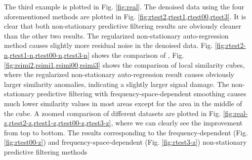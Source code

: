 The third example is plotted in Fig. \ref{fig:real}. The denoised data using the four aforementioned methods are plotted in Fig. \ref{fig:rtest2,rtest1,rtest00,rtest3}. It is clear that both non-stationary predictive filtering results are obviously cleaner than the other two results. The regularized non-stationary auto-regression method causes slightly more residual noise in the denoised data. Fig. \ref{fig:rtest2-n,rtest1-n,rtest00-n,rtest3-n} shows the comparison of , Fig. \ref{fig:rsimi2,rsimi1,rsimi00,rsimi3} shows the comparison of local similarity cubes, where the regularized non-stationary auto-regression result causes obviously larger similarity anomalies, indicating a slightly larger signal damage. The non-stationary predictive filtering with frequency-space-dependent smoothing causes much lower similarity values in most areas except for the area in the middle of the cube.  A zoomed comparison of different datasets are plotted in Fig. \ref{fig:real-z,rtest2-z,rtest1-z,rtest00-z,rtest3-z}, where we can clearly see the improvement from top to bottom. The results corresponding to the frequency-dependent (Fig. \ref{fig:rtest00-z}) and frequency-space-dependent (Fig. \ref{fig:rtest3-z}) non-stationary predictive filtering methods  

